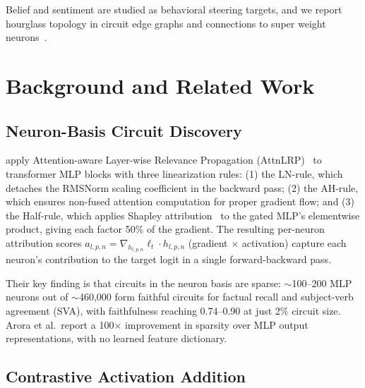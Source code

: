 \documentclass[11pt]{article}
\begin{document}
Belief and sentiment are studied as behavioral steering targets, and we report hourglass topology in circuit edge graphs and connections to super weight neurons~\citep{yu2024superweights}.


\section{Background and Related Work}
\label{sec:background}

\subsection{Neuron-Basis Circuit Discovery}
\label{sec:bg_neuron}

\citet{arora2025circuits} apply Attention-aware Layer-wise Relevance Propagation (AttnLRP)~\citep{achtibat2024relp} to transformer MLP blocks with three linearization rules: (1) the LN-rule, which detaches the RMSNorm scaling coefficient in the backward pass; (2) the AH-rule, which ensures non-fused attention computation for proper gradient flow; and (3) the Half-rule, which applies Shapley attribution~\citep{shapley1953value} to the gated MLP's elementwise product, giving each factor 50\% of the gradient.
The resulting per-neuron attribution scores $a_{l,p,n} = \nabla_{h_{l,p,n}} \ell_t \cdot h_{l,p,n}$ (gradient $\times$ activation) capture each neuron's contribution to the target logit in a single forward-backward pass.

Their key finding is that circuits in the neuron basis are sparse: ${\sim}$100--200 MLP neurons out of ${\sim}$460,000 form faithful circuits for factual recall and subject-verb agreement (SVA), with faithfulness reaching 0.74--0.90 at just 2\% circuit size.
Arora et al.\ report a 100$\times$ improvement in sparsity over MLP output representations, with no learned feature dictionary.

\subsection{Contrastive Activation Addition}
\label{sec:bg_caa}
\end{document}
